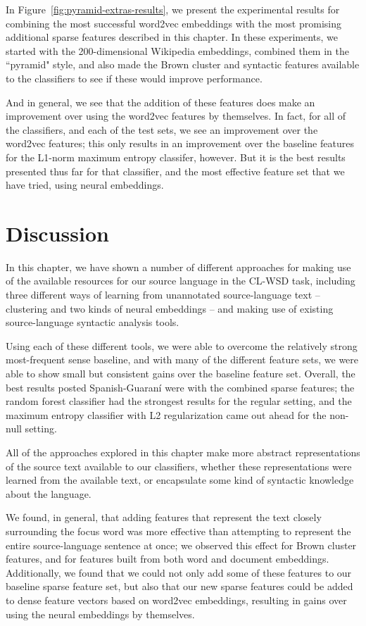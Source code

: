 In Figure~\ref{fig:pyramid-extras-results}, we present the experimental results
for combining the most successful word2vec embeddings with the most promising
additional sparse features described in this chapter. In these experiments, we
started with the 200-dimensional Wikipedia embeddings, combined them in the
``pyramid" style, and also made the Brown cluster and syntactic features
available to the classifiers to see if these would improve performance.

And in general, we see that the addition of these features does make an
improvement over using the word2vec features by themselves. In fact, for all of
the classifiers, and each of the test sets, we see an improvement over the
word2vec features; this only results in an improvement over the baseline
features for the L1-norm maximum entropy classifer, however. But it is the best
results presented thus far for that classifier, and the most effective feature
set that we have tried, using neural embeddings.

\section{Discussion}
In this chapter, we have shown a number of different approaches for making use
of the available resources for our source language in the CL-WSD task,
including three different ways of learning from unannotated source-language
text -- clustering and two kinds of neural embeddings -- and making use of
existing source-language syntactic analysis tools.

Using each of these different tools, we were able to overcome the relatively
strong most-frequent sense baseline, and with many of the different feature
sets, we were able to show small but consistent gains over the baseline feature
set. Overall, the best results posted Spanish-Guaraní were with the combined
sparse features; the random forest classifier had the strongest results for the
regular setting, and the maximum entropy classifier with L2 regularization came
out ahead for the non-null setting.

All of the approaches explored in this chapter make more abstract
representations of the source text available to our classifiers, whether these
representations were learned from the available text, or encapsulate some kind
of syntactic knowledge about the language.

We found, in general, that adding features that represent the text closely
surrounding the focus word was more effective than attempting to represent the
entire source-language sentence at once; we observed this effect for Brown
cluster features, and for features built from both word and document
embeddings.
Additionally, we found that we could not only add some of these features to our
baseline sparse feature set, but also that our new sparse features could be
added to dense feature vectors based on word2vec embeddings, resulting in gains
over using the neural embeddings by themselves.

